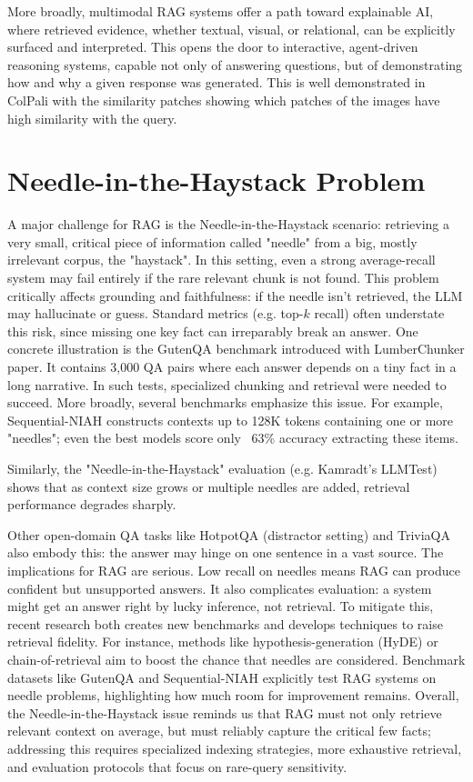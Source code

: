 \documentclass[12pt,twoside]{report}
\begin{document}
More broadly, multimodal RAG systems offer a path toward explainable AI\cite{ExplainAI}, where retrieved evidence, whether textual, visual, or relational, can be explicitly surfaced and interpreted. This opens the door to interactive, agent-driven reasoning systems, capable not only of answering questions, but of demonstrating how and why a given response was generated. This is well demonstrated in ColPali with the similarity patches showing which patches of the images have high similarity with the query.

\section{Needle-in-the-Haystack Problem}
A major challenge for RAG is the Needle-in-the-Haystack scenario: retrieving a very small, critical piece of information called "needle" from a big, mostly irrelevant corpus, the "haystack". In this setting, even a strong average-recall system may fail entirely if the rare relevant chunk is not found. This problem critically affects grounding and faithfulness: if the needle isn't retrieved, the LLM may hallucinate or guess. Standard metrics (e.g. top-$k$ recall) often understate this risk, since missing one key fact can irreparably break an answer.
One concrete illustration is the GutenQA benchmark introduced with LumberChunker\cite{LumberChunker} paper. It contains 3,000 QA pairs where each answer depends on a tiny fact in a long narrative. In such tests, specialized chunking and retrieval were needed to succeed. More broadly, several benchmarks emphasize this issue. For example, Sequential-NIAH\cite{SequentialNIAH} constructs contexts up to 128K tokens containing one or more "needles"; even the best models score only ~63\% accuracy extracting these items.

Similarly, the "Needle-in-the-Haystack" evaluation (e.g. Kamradt's LLMTest\cite{NeedleInHaystackTest}) shows that as context size grows or multiple needles are added, retrieval performance degrades sharply.

Other open-domain QA tasks like HotpotQA\cite{HotpotQA} (distractor setting) and TriviaQA\cite{TriviaQA} also embody this: the answer may hinge on one sentence in a vast source. The implications for RAG are serious. Low recall on needles means RAG can produce confident but unsupported answers. It also complicates evaluation: a system might get an answer right by lucky inference, not retrieval. To mitigate this, recent research both creates new benchmarks and develops techniques to raise retrieval fidelity. For instance, methods like hypothesis-generation (HyDE) or chain-of-retrieval aim to boost the chance that needles are considered. Benchmark datasets like GutenQA and Sequential-NIAH explicitly test RAG systems on needle problems, highlighting how much room for improvement remains. Overall, the Needle-in-the-Haystack issue reminds us that RAG must not only retrieve relevant context on average, but must reliably capture the critical few facts; addressing this requires specialized indexing strategies, more exhaustive retrieval, and evaluation protocols that focus on rare-query sensitivity.
\end{document}
